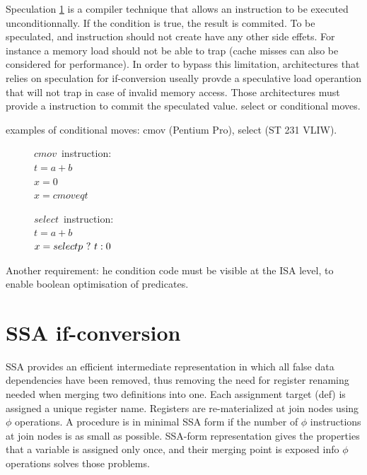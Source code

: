 Speculation \ref{fig:spec} is a compiler technique that allows an instruction to be executed unconditionnally. If the condition is true, the result is commited. To be speculated, and instruction should not create have any other side effets. For instance a memory load should not be able to trap (cache misses can also be considered for performance). In order to bypass this limitation, architectures that relies on speculation for if-conversion useally provde a speculative load operantion that will not trap in case of invalid memory access. Those architectures must provide a instruction to commit the speculated value. select or conditional moves.

examples of conditional moves: cmov (Pentium Pro), select (ST 231 VLIW).

\begin{figure}
\begin{minipage}[t]{4cm}
\mbox{$cmov$ instruction:} \\
$t = a + b $ \\
$x = 0 $ \\
$x = cmoveq t $ \\
\end{minipage}
\begin{minipage}[t]{4cm}
\mbox{$select$ instruction:} \\
$t = a + b $ \\
$x = select p ~?~ t : 0 $ \\
\end{minipage}
\label{fig:spec}
\end{figure}

Another requirement: he condition code must be visible at the ISA level, to enable boolean optimisation of predicates.

\section{SSA if-conversion}

SSA provides an efficient intermediate representation in which all false data dependencies have been removed, thus removing the need for register renaming needed when merging two definitions into one. Each assignment target (def) is assigned a unique register name. Registers are re-materialized at join nodes using $\phi$ operations. A procedure is in minimal SSA form if the number of $\phi$ instructions at join nodes is as small as possible. SSA-form representation gives the properties that a variable is assigned only once, and their merging point is exposed info $\phi$ operations solves those problems. 

